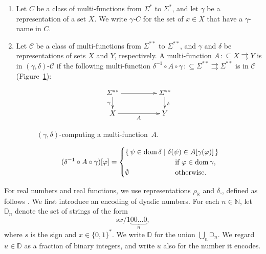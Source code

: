 \documentclass[envcountsect,envcountsame,orivec,oribibl]{llncs}
\newcommand{\R}{\mathbb R}
\newcommand{\N}{\mathbb N}
\newcommand{\D}{\mathbb D}
\newcommand{\deltabox}{\delta _\square}
\newcommand{\rhoR}{\rho _\R}
\newcommand{\LM}{\varSigma ^{**}}
\newcommand{\dom}{\mathop{\rm dom}}
\newcommand{\pcolon}{\mathpunct{\,:\subseteq}}
\begin{document}
\begin{definition}
\label{definition: computation wrt representation}
\begin{enumerate}
\item 
Let $C$ be a class of multi-functions from $\varSigma ^*$ to $\varSigma ^*$, 
and let $\gamma$ be a representation of a set $X$. 
We write \emph{$\gamma$-$C$} for the set of $x \in X$
that have a $\gamma$-name in $C$.
\item  \label{enumi: computing wrt representation}
Let $\mathcal C$ be a class of multi-functions from $\LM$ to $\LM$,
and $\gamma$ and $\delta$ be representations of sets $X$ and $Y$, respectively.
A multi-function $A \pcolon X \rightrightarrows Y$
is in $(\gamma, \delta)$-$\mathcal C$ if 
the following multi-function $
\delta^{-1} \circ A \circ \gamma \pcolon \LM \rightrightarrows \LM
$ is in $\mathcal C$ (Figure~\ref{figure: realization}): 
\begin{figure}[t]
\begin{equation*}
  \xymatrix@C=50pt@R=16pt{
   \LM \ar[r] \ar[d] _\gamma & \LM \ar[d] ^\delta  \\
   X \ar[r] _A & Y 
  }
\end{equation*}
 \caption{$(\gamma, \delta)$-computing a multi-function~$A$.}
 \label{figure: realization}
\end{figure}
\begin{equation}
 (\delta^{-1} \circ A \circ \gamma)[\varphi] = 
  \begin{cases}
   \rlap{$\{\, \psi \in \dom \delta \mid \delta(\psi) \in A[\gamma(\varphi)] \,\}$} \hspace*{6em}
   \\
   & 
   \text{if } \varphi \in \dom \gamma, 
   \\ 
   \emptyset 
   &
   \text{otherwise.}
  \end{cases}
\end{equation}
\end{enumerate}
\end{definition}

For real numbers and real functions,
we use representations $\rhoR$ and $\deltabox$, 
defined as follows \cite{kawamura2012complexity}. 
We first introduce an encoding of dyadic numbers.
For each $n \in \N$, let $\D_n$ denote the set of strings of the form
\begin{equation}
 sx/1\!\underbrace{00\dots0}_{n},
\end{equation}
where $s$ is the sign and $x \in \{0,1\}^*$.
We write $\D$ for the union $\bigcup _n \D _n$.
We regard $u \in \D$ as a fraction of binary integers, 
and write $u$ also for the number it encodes. 
\end{document}

